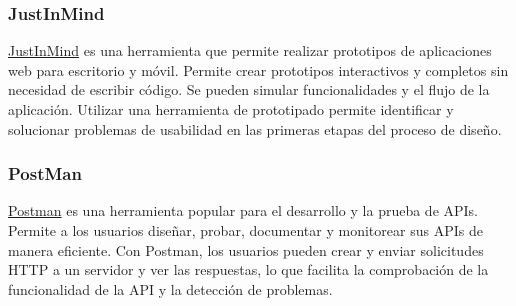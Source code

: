 \subsubsection{JustInMind}
\href{https://www.justinmind.com/?k=just%20in%20mind&a=688685974017&adg=52001997837&cmp=1063145459&match=e&adposition=&utm_medium=cpc&utm_source=google&utm_campaign=1063145459&utm_term=just%20in%20mind_e&gad_source=1&gclid=Cj0KCQjw6auyBhDzARIsALIo6v8LqBRhq_QPIUhxUJt3DHKqPNfvJxZEdrFx4f1jqgqKfJ6g998HKFwaAm_WEALw_wcB}{JustInMind} es una herramienta que permite realizar prototipos de aplicaciones web para escritorio y móvil. Permite crear prototipos interactivos y completos sin necesidad de escribir código. Se pueden simular funcionalidades y el flujo de la aplicación. Utilizar una herramienta de prototipado permite identificar y solucionar problemas de usabilidad en las primeras etapas del proceso de diseño.
\subsubsection{PostMan}
\href{https://www.postman.com/}{Postman} es una herramienta popular para el desarrollo y la prueba de APIs. Permite a los usuarios diseñar, probar, documentar y monitorear sus APIs de manera eficiente. Con Postman, los usuarios pueden crear y enviar solicitudes HTTP a un servidor y ver las respuestas, lo que facilita la comprobación de la funcionalidad de la API y la detección de problemas.

